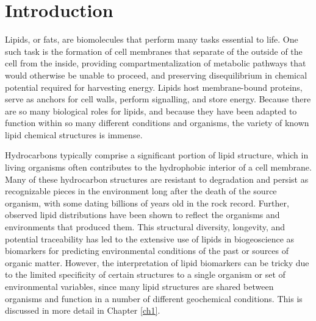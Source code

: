 \chapter{Introduction}


Lipids, or fats, are biomolecules that perform many tasks essential to life. One such task is the formation of cell membranes that separate of the outside of the cell from the inside, providing compartmentalization of metabolic pathways that would otherwise be unable to proceed, and preserving disequilibrium in chemical potential required for harvesting energy. Lipids host membrane-bound proteins, serve as anchors for cell walls, perform signalling, and store energy. Because there are so many biological roles for lipids, and because they have been adapted to function within so many different conditions and organisms, the variety of known lipid chemical structures is immense.

Hydrocarbons typically comprise a significant portion of lipid structure, which in living organisms often contributes to the hydrophobic interior of a cell membrane. Many of these hydrocarbon structures are resistant to degradation and persist as recognizable pieces in the environment long after the death of the source organism, with some dating billions of years old in the rock record. Further, observed lipid distributions have been shown to reflect the organisms and environments that produced them. This structural diversity, longevity, and potential traceability has led to the extensive use of lipids in biogeoscience as biomarkers for predicting environmental conditions of the past or sources of organic matter. However, the interpretation of lipid biomarkers can be tricky due to the limited specificity of certain structures to a single organism or set of environmental variables, since many lipid structures are shared between organisms and function in a number of different geochemical conditions. This is discussed in more detail in Chapter \ref{ch1}.

